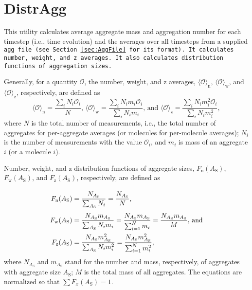 \section{DistrAgg} \label{sec:DistrAgg}

This utility calculates average aggregate mass and aggregation number for
each timestep (i.e., time evolution) and the averages over all timesteps
from a supplied \tt{agg} file (see Section~\ref{sec:AggFile} for its format).
It calculates number, weight, and z averages. It also calculates
distribution functions of aggregation sizes.

Generally, for a quantity $\mathcal{O}$, the number, weight, and z averages,
$\langle\mathcal{O}\rangle_{\text{n}}$,
$\langle\mathcal{O}\rangle_{\text{w}}$, and
$\langle\mathcal{O}\rangle_{\text{z}}$, respectively, are defined as
\begin{equation} \label{eq:Avg}
  \langle\mathcal{O}\rangle_{\text{n}} = \frac{\sum_i N_i\mathcal{O}_i     }{N}
  \mbox{, \ \ \ }
  \langle\mathcal{O}\rangle_{\text{w}} = \frac{\sum_i N_im_i\mathcal{O}_i  }{\sum_i N_i m_i}
  \mbox{, and \ \ \ }
  \langle\mathcal{O}\rangle_{\text{z}} = \frac{\sum_i N_im_i^2\mathcal{O}_i}{\sum_i N_i m_i^2},
\end{equation}
where $N$ is the total number of measurements, i.e., the total number of
aggregates for per-aggregate averages (or molecules for per-molecule
averages); $N_i$ is the number of measurements with the value
$\mathcal{O}_i$, and $m_i$ is mass of an aggregate $i$ (or a molecule $i$).

Number, weight, and z distribution functions of aggregate sizes,
$F_{\text{n}}(A_{\text{S}})$, $F_{\text{w}}(A_{\text{S}})$, and
$F_{\text{z}}(A_{\text{S}})$, respectively, are defined as
\begin{equation} \label{eq:Fnwz}
  \arraycolsep=1.4pt\def\arraystretch{2.5}
  \begin{array}{>{\displaystyle}rc>{\displaystyle}l}
    F_{\text{n}}(A_\text{S}) & = & \frac{N_{A_{\text{S}} }}{\sum_{A_{\text{S}} } N_i} =
    \frac{N_{A_{\text{S}} }}{N}
  \mbox{,} \\
    F_{\text{w}}(A_\text{S}) & = & \frac{N_{A_{\text{S}} } m_{A_{\text{S}} }}{\sum_{A_{\text{S}} } N_i m_i} =
    \frac{N_{A_{\text{S}} } m_{A_{\text{S}} }}{\sum_{i=1}^N m_i} =
    \frac{N_{A_{\text{S}} } m_{A_{\text{S}} }}{M}
  \mbox{, and} \\
    F_{\text{z}}(A_\text{S}) & = & \frac{N_{A_{\text{S}} } m^2_{A_{\text{S}}
    }}{\sum_{A_{\text{S}} } N_i m_i^2} =
    \frac{N_{A_{\text{S}} } m^2_{A_{\text{S}} }}{\sum_{i=1}^N m_i^2}, \\
  \end{array}
\end{equation}
where $N_{A_{\text{S}}}$ and $m_{A_{\text{S}}}$ stand for the number
and mass, respectively, of aggregates with aggregate size $A_{\text{S}}$;
$M$ is the total mass of all aggregates. The equations are normalized so
that $\sum F_x(A_{\text{S}})=1$.

